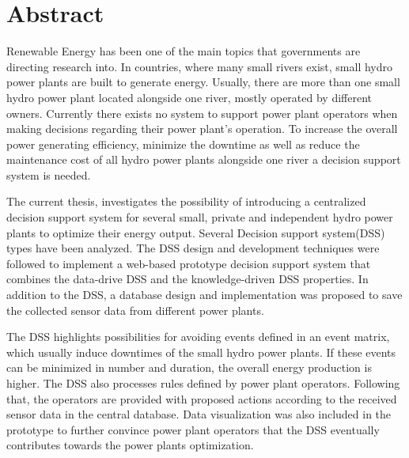 \chapter*{Abstract}
Renewable Energy has been one of the main topics that governments are directing research into. In countries, where many small rivers exist, small hydro power plants are built to generate energy. Usually, there are more than one small hydro power plant located alongside one river, mostly operated by different owners. Currently there exists no system to support power plant operators when making decisions regarding their power plant's operation. To increase the overall power generating efficiency, minimize the downtime as well as reduce the maintenance cost of all hydro power plants alongside one river a decision support system is needed.

The current thesis, investigates the possibility of introducing a centralized decision support system for several small, private and independent hydro power plants to optimize their energy output. Several Decision support system(DSS) types have been analyzed. The DSS design and development techniques were followed to implement a web-based prototype decision support system that combines the data-drive DSS and the knowledge-driven DSS properties. In addition to the DSS, a database design and implementation was proposed to save the collected sensor data from different power plants. 

The DSS highlights possibilities for avoiding events defined in an event matrix, which usually induce downtimes of the small hydro power plants. If these events can be minimized in number and duration, the overall energy production is higher. The DSS also processes rules defined by power plant operators. Following that, the operators are provided with proposed actions according to the received sensor data in the central database. Data visualization was also included in the prototype to further convince power plant operators that the DSS eventually contributes towards the power plants optimization. 

 